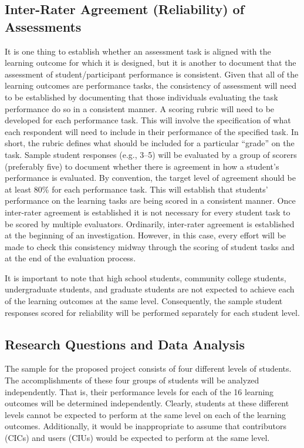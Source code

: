 \documentclass[11pt]{NSFamsart}
\begin{document}
\subsection{Inter-Rater Agreement (Reliability) of Assessments}
It is one thing to establish whether an assessment task is aligned with the learning outcome for which it is designed, but it is another to document that the assessment of student/participant performance is consistent. Given that all of the learning outcomes are performance tasks, the consistency of assessment will need to be established by documenting that those individuals evaluating the task performance do so in a consistent manner. A scoring rubric will need to be developed for each performance task. This will involve the specification of what each respondent will need to include in their performance of the specified task. In short, the rubric defines what should be included for a particular ``grade'' on the task. Sample student responses (e.g., 3--5) will be evaluated by a group of scorers (preferably five) to document whether there is agreement in how a student's performance is evaluated. By convention, the target level of agreement should be at least 80\% for each performance task. This will establish that students' performance on the learning tasks are being scored in a consistent manner. Once inter-rater agreement is established it is not necessary for every student task to be scored by multiple evaluators. Ordinarily, inter-rater agreement is established at the beginning of an investigation. However, in this case, every effort will be made to check this consistency midway through the scoring of student tasks and at the end of the evaluation process.

It is important to note that high school students, community college students, undergraduate students, and graduate students are not expected to achieve each of the learning outcomes at the same level. Consequently, the sample student responses scored for reliability will be performed separately for each student level.

\subsection{Research Questions and Data Analysis}
The sample for the proposed project consists of four different levels of students. The accomplishments of these four groups of students will be analyzed independently. That is, their performance levels for each of the 16 learning outcomes will be determined independently. Clearly, students at these different levels cannot be expected to perform at the same level on each of the learning outcomes. Additionally, it would be inappropriate to assume that contributors (CICs) and users (CIUs) would be expected to perform at the same level. 
\end{document}
